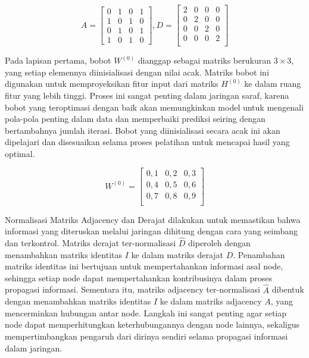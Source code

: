 \vspace{0.3cm}
$$
A = 
\begin{bmatrix}
0 & 1 & 0 & 1 \\
1 & 0 & 1 & 0 \\
0 & 1 & 0 & 1 \\
1 & 0 & 1 & 0
\end{bmatrix}
,
D = 
\begin{bmatrix}
2 & 0 & 0 & 0 \\
0 & 2 & 0 & 0 \\
0 & 0 & 2 & 0 \\
0 & 0 & 0 & 2 \\
\end{bmatrix}
$$
\vspace{0.5cm}\par

Pada lapisan pertama, bobot $W^{(0)}$ dianggap sebagai matriks berukuran $3 \times 3$, yang setiap elemennya diinisialisasi dengan nilai acak. Matriks bobot ini digunakan untuk memproyeksikan fitur input dari matriks $H^{(0)}$ ke dalam ruang fitur yang lebih tinggi. Proses ini sangat penting dalam jaringan saraf, karena bobot yang teroptimasi dengan baik akan memungkinkan model untuk mengenali pola-pola penting dalam data dan memperbaiki prediksi seiring dengan bertambahnya jumlah iterasi. Bobot yang diinisialisasi secara acak ini akan dipelajari dan disesuaikan selama proses pelatihan untuk mencapai hasil yang optimal.\par
\vspace{0.3cm}
  $$
  W^{(0)} = \begin{bmatrix}
  0,1 & 0,2 & 0,3 \\
  0,4 & 0,5 & 0,6 \\
  0,7 & 0,8 & 0,9 \\
  \end{bmatrix}
  $$
\vspace{0.5cm}\par
Normalisasi Matriks Adjacency dan Derajat dilakukan untuk memastikan bahwa informasi yang diteruskan melalui jaringan dihitung dengan cara yang seimbang dan terkontrol. Matriks derajat ter-normalisasi $\hat{D}$ diperoleh dengan menambahkan matriks identitas $I$ ke dalam matriks derajat $D$. Penambahan matriks identitas ini bertujuan untuk mempertahankan informasi asal node, sehingga setiap node dapat mempertahankan kontribusinya dalam proses propagasi informasi. Sementara itu, matriks adjacency ter-normalisasi $\hat{A}$ dibentuk dengan menambahkan matriks identitas $I$ ke dalam matriks adjacency $A$, yang mencerminkan hubungan antar node. Langkah ini sangat penting agar setiap node dapat memperhitungkan keterhubungannya dengan node lainnya, sekaligus mempertimbangkan pengaruh dari dirinya sendiri selama propagasi informasi dalam jaringan. \par
